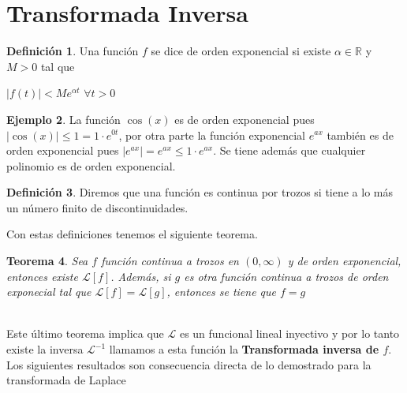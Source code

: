 \documentclass{article}
\theoremstyle{plain}
\newtheorem{thm}{Teorema}[section]
\theoremstyle{definition}
\newtheorem{defin}[thm]{Definición}
\newtheorem{ejem}[thm]{Ejemplo}
\begin{document}
\newpage



\section{Transformada Inversa}


\begin{defin}Una función $f$ se dice de orden exponencial si existe $\alpha \in \mathbb{R}$ y $M >0$ tal que
\end{defin}

\begin{center}
$\displaystyle |f(t)| < Me^{\alpha t}$  $\forall t>0$
\end{center}


\begin{ejem}La función $\cos(x)$ es de orden exponencial pues $|\cos(x)| \leq 1 = 1 \cdot e^{0 t}$, por otra parte la función exponencial $e^{ax}$ también es de orden exponencial pues $|e^{ax}| =e^{ax} \leq 1 \cdot e^{ax}$. Se tiene además que cualquier polinomio es de orden exponencial. \\
\end{ejem}



\begin{defin}Diremos que una función es continua por trozos si tiene a lo más un número finito de discontinuidades. \\
\end{defin}

Con estas definiciones tenemos el siguiente teorema. \\

\begin{thm}Sea $f$ función continua a trozos en $(0,\infty)$ y de orden exponencial, entonces existe $\mathcal{L}[f]$. Además, si $g$ es otra función continua a trozos de orden exponecial tal que $\mathcal{L}[f]=\mathcal{L}[g]$, entonces se tiene que $f=g$ \\ \\
\end{thm}

Este último teorema implica que $\mathcal{L}$ es un funcional lineal inyectivo y por lo tanto existe la inversa $\mathcal{L}^{-1}$ llamamos a esta función la \textbf{Transformada inversa de $f$}. \\

Los siguientes resultados son consecuencia directa de lo demostrado para la transformada de Laplace
\end{document}
